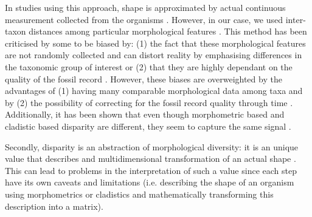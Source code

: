 In studies using this approach, shape is approximated by actual continuous measurement collected from the organisms \citep[e.g.][]{friedmanexplosive2010,hopkinsdecoupling2013,finlay2015morphological}.
However, in our case, we used inter-taxon distances among particular morphological features \citep[e.g.][]{foote1997evolution,Wills2001,Wesley-Hunt2005}.
This method has been criticised by some to be biased by: (1) the fact that these morphological features are not randomly collected and can distort reality by emphasising differences in the taxonomic group of interest \citep{Hopkins24032015} or (2) that they are highly dependant on the quality of the fossil record \citep{Butler2012}.
However, these biases are overweighted by the advantages of (1) having many comparable morphological data among taxa \citep{Brusatte12092008} and by (2) the possibility of correcting for the fossil record quality through time \citep{Butler2012}.
Additionally, it has been shown that even though morphometric based and cladistic based disparity are different, they seem to capture the same signal \citep{foth2012different,hetherington2015cladistic}.

Secondly, disparity is an abstraction of morphological diversity: it is an unique value that describes and multidimensional transformation of an actual shape \citep{Wills1994,foote1997evolution}. %
This can lead to problems in the interpretation of such a value since each step have its own caveats and limitations (i.e. describing the shape of an organism using morphometrics or cladistics and mathematically transforming this description into a matrix).

